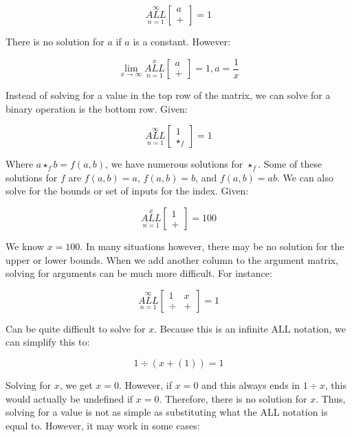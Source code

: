 \documentclass{article}
\begin{document}
$$\underset{n=1}{\overset{\infty}{ALL}} \begin{bmatrix}
a \\
+
\end{bmatrix} = 1$$

There is no solution for $a$ if $a$ is a constant. However:

$$\underset{x \rightarrow \infty}{\lim} \underset{n=1}{\overset{x}{ALL}} \begin{bmatrix}
a \\
+
\end{bmatrix} = 1, a = \frac{1}{x}$$

Instead of solving for a value in the top row of the matrix, we can solve for a binary operation is the bottom row. Given:

$$\underset{n=1}{\overset{\infty}{ALL}} \begin{bmatrix}
1 \\
\star_f
\end{bmatrix} = 1$$

Where $a \star_f b = f(a,b)$, we have numerous solutions for $\star_f$. Some of these solutions for $f$ are $f(a,b)=a$, $f(a,b)=b$, and $f(a,b)=ab$. We can also solve for the bounds or set of inputs for the index. Given:

$$\underset{n=1}{\overset{x}{ALL}} \begin{bmatrix}
1 \\
+
\end{bmatrix} = 100$$

We know $x=100$. In many situations however, there may be no solution for the upper or lower bounds. When we add another column to the argument matrix, solving for arguments can be much more difficult. For instance:

$$\underset{n=1}{\overset{\infty}{ALL}} \begin{bmatrix}
1 & x \\
\div & +
\end{bmatrix} = 1$$

Can be quite difficult to solve for $x$. Because this is an infinite ALL notation, we can simplify this to:

$$1 \div (x + (1)) = 1$$

Solving for $x$, we get $x=0$. However, if $x=0$ and this always ends in $1 \div x$, this would actually be undefined if $x=0$. Therefore, there is no solution for $x$. Thus, solving for a value is not as simple as substituting what the ALL notation is equal to. However, it may work in some cases:
\end{document}
